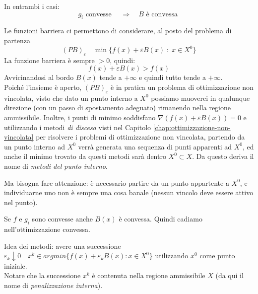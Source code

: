 \begin{observation}
In entrambi i casi: 
$$ g_i \text{ convesse } \quad \Rightarrow \quad B 
\text{ \`e convessa }$$
\end{observation}
Le funzioni barriera ci permettono di considerare, al posto del
problema di partenza
$$(PB)_{\varepsilon} \quad \min\{f(x) + \varepsilon B(x) \; : \; x \in X^{0} \} $$
La funzione barriera \`e sempre $> 0$, quindi:
$$f(x) + \varepsilon B(x) > f(x)$$
Avvicinandosi al bordo $B(x)$ tende a $+\infty$ e quindi tutto
tende a $+ \infty$.\\
Poich\'e l'insieme \`e aperto, $(PB)_{\varepsilon}$ \`e in pratica un problema di ottimizzazione non vincolata, visto che dato un punto interno a $X^0$ possiamo muoverci in qualunque direzione (con un passo di spostamento adeguato) rimanendo nella regione ammissibile. Inoltre, i punti di minimo soddisfano $\nabla(f(x) + \varepsilon B(x)) =0$
e utilizzando i metodi \emph{di discesa} visti nel Capitolo \ref{chap:ottimizzazione-non-vincolata} per risolvere i problemi di ottimizzazione non vincolata, partendo da un punto interno ad $X^0$ verrà generata una sequenza di punti apparenti ad $X^{0}$, ed anche il minimo trovato da questi metodi sarà dentro $X^0 \subset X$. Da questo deriva il nome di \emph{metodi del punto interno}.

Ma bisogna fare attenzione: è necessario partire da un punto appartente a $X^{0}$, e individuarne uno non è sempre una cosa banale (nessun vincolo deve essere attivo nel punto).
\begin{observation}
  Se $f$ e $g_i$ sono convesse anche $B(x)$ \`e convessa.
Quindi cadiamo nell'ottimizzazione convessa.
\end{observation}
Idea dei metodi: avere una successione $\varepsilon_{k}\downarrow 0
\quad x^{k} \in argmin \{ f(x) + \varepsilon_{k} B(x): x \in X^{0} \}$
utilizzando $x^{0}$ come punto iniziale. \\
Notare che la successione $x^{k}$ \`e contenuta nella regione
ammissibile $X$ (da qui il nome di \emph{penalizzazione interna}).

